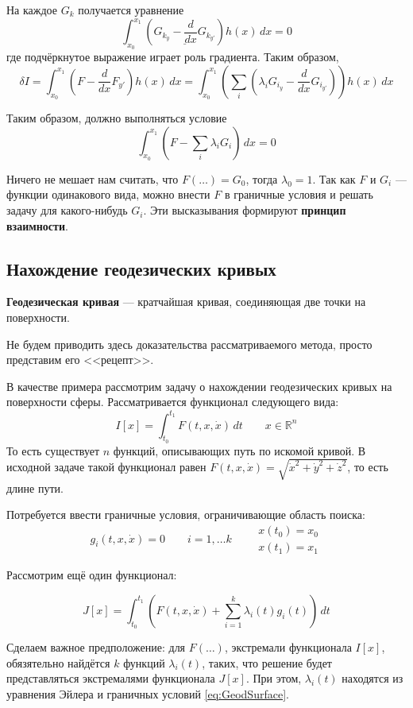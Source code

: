 \documentclass[12pt]{article}
\begin{document}
	На каждое $G_k$ получается уравнение
	$$\int_{x_0}^{x_1} \left(\underline{G_{k_y} - \frac{d}{dx}G_{k_{y'}}}\right) h(x)\,dx = 0$$	
	где подчёркнутое выражение играет роль градиента. Таким образом,
	$$\delta I = \int_{x_0}^{x_1} \left(F - \frac{d}{dx}F_{y'}\right)h(x) \,dx 
	  = \int_{x_0}^{x_1} \left(\sum_i \left(\lambda_i G_{i_y} - \frac{d}{dx}G_{i_{y'}} \right)\right)h(x) \,dx$$
	  
	Таким образом, должно выполняться условие
	$$\int_{x_0}^{x_1} \left(F - \sum_i \lambda_i G_i\right) \,dx = 0$$
	
	Ничего не мешает нам считать, что $F(\ldots) = G_0$, тогда $\lambda_0 = 1$. Так как 
	$F$ и $G_i$ --- функции одинакового вида, можно внести $F$ в граничные условия и решать
	задачу для какого-нибудь $G_i$. Эти высказывания формируют \textbf{принцип взаимности}.
	
	
	\subsection{Нахождение геодезических кривых}
	
	\begin{defi}
		\textbf{Геодезическая кривая} --- кратчайшая кривая, соединяющая две точки на поверхности.
	\end{defi}
	
	Не будем приводить здесь доказательства рассматриваемого метода, просто представим его <<рецепт>>.
	
	В качестве примера рассмотрим задачу о нахождении геодезических кривых на поверхности сферы.
	Рассматривается функционал следующего вида:
	$$I[x] = \int_{t_0}^{t_1} F(t,x,\dot{x})\,dt \qquad x \in \mathbb{R}^n$$
	То есть существует $n$ функций, описывающих путь по искомой кривой. В исходной задаче такой
	функционал равен $F(t,x,\dot{x}) = \sqrt{\dot{x}^2 + \dot{y}^2 + \dot{z}^2}$, то есть длине
	пути.
	
	Потребуется ввести граничные условия, ограничивающие область поиска:
	\begin{equation} \label{eq:GeodSurface}
		g_i(t, x, \dot{x}) = 0 \qquad i = 1,\ldots k \qquad
		\begin{aligned}
			x(t_0) = x_0 \\
			x(t_1) = x_1
		\end{aligned}
	\end{equation}

	Рассмотрим ещё один функционал:
	
	$$J[x] = \int_{t_0}^{t_1} \left(F(t,x,\dot{x}) + \sum_{i=1}^k \lambda_i(t) g_i(t)\right)\,dt$$
	
	Сделаем важное предположение: для $F(\ldots)$, экстремали функционала $I[x]$, обязятельно найдётся
	$k$ функций $\lambda_i(t)$, таких, что решение будет представляться экстремалями функционала $J[x]$.
	При этом, $\lambda_i(t)$ находятся из уравнения Эйлера и граничных условий \ref{eq:GeodSurface}.
	
\end{document}

